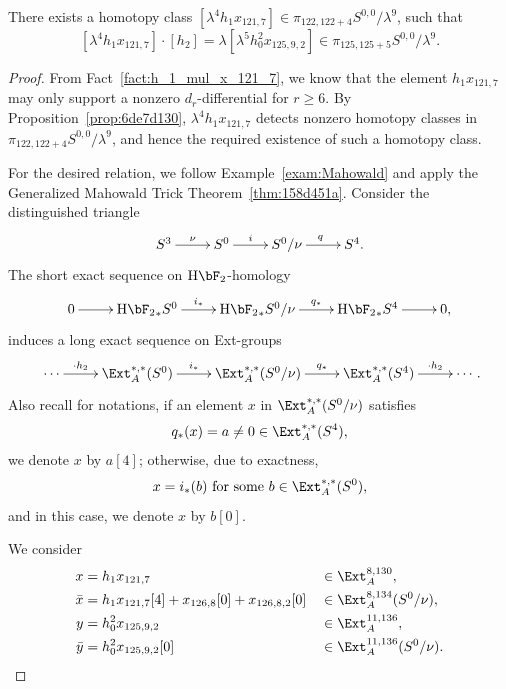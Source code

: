 \documentclass{amsart}
\numberwithin{equation}{section}
\newcommand{\HF}{\mathrm{H}\bF_2}
\begin{document}
\begin{lemma} \label{lem:nuext125}
    There exists a homotopy class $[\lambda^4 h_1 x_{121,7}] \in \pi_{122,122+4}S^{0,0}/\lambda^9$, such that 
    $$[\lambda^4 h_1 x_{121,7}] \cdot [h_2] = \lambda [\lambda^5 h_0^2 x_{125,9,2}] \in \pi_{125,125+5} S^{0,0}/\lambda^9.$$
\end{lemma}

\begin{proof}
    From Fact~\ref{fact:h_1_mul_x_121_7}, we know that the element $h_1x_{121,7}$ may only support a nonzero $d_r$-differential for $r \ge 6$. By Proposition~\ref{prop:6de7d130}, $\lambda^4 h_1 x_{121,7}$ detects nonzero homotopy classes in $\pi_{122,122+4}S^{0,0}/\lambda^9$, and hence the required existence of such a homotopy class.

    For the desired relation, we follow Example~\ref{exam:Mahowald} and apply the Generalized Mahowald Trick Theorem~\ref{thm:158d451a}. Consider the distinguished triangle
        $$\xymatrix{S^3 \ar[r]^{\nu} & S^0 \ar[r]^-{i} & S^0/\nu \ar[r]^{q} & S^4.}$$
The short exact sequence on $\HF$-homology
$$\xymatrix{0 \ar[r] & {\HF}_*S^0 \ar[r]^-{i_*} & {\HF}_*S^0/\nu \ar[r]^-{q_*} & {\HF}_*S^4 \ar[r] & 0,}$$
induces a long exact sequence on Ext-groups
$$\xymatrix{\cdots \ar[r]^-{\cdot h_2} & {\Ext}_A^{*,*}(S^0) \ar[r]^-{i_*} & {\Ext}_A^{*,*}(S^0/\nu) \ar[r]^-{q_*} & {\Ext}_A^{*,*}(S^4) \ar[r]^-{\cdot h_2} & \cdots}.$$
Also recall for notations, if an element $x$ in ${\Ext}_A^{*,*}(S^0/\nu)$ satisfies 
$$q_*(x) = a \neq 0 \in \Ext_A^{*,*}(S^4),$$ 
we denote $x$ by $a[4]$; otherwise, due to exactness, 
$$x = i_*(b) \ \text{for some} \ b \in \Ext_A^{*,*}(S^0),$$
and in this case, we denote $x$ by $b[0]$. 

We consider
\begin{align*}
x & = h_1 x_{121,7} && \in \Ext_A^{8,130},\\
\bar{x} & =h_1 x_{121,7} [4] + x_{126,8}[0] + x_{126,8,2}[0] && \in \Ext_A^{8,134}(S^0/\nu), \\
y & =h_0^2 x_{125,9,2} && \in \Ext_A^{11,136} ,\\
        \bar{y} & =h_0^2 x_{125,9,2}[0] && \in \Ext_A^{11,136}(S^0/\nu). 
  \end{align*}      


\end{proof}
\end{document}
